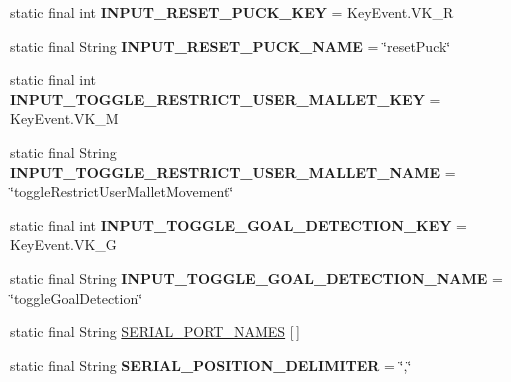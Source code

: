 \begin{DoxyCompactItemize}
\item 
\hypertarget{classairhockeyjava_1_1game_1_1_constants_ac1cc01461daf8fe8e9f797491b94dc05}{}static final int {\bfseries I\+N\+P\+U\+T\+\_\+\+R\+E\+S\+E\+T\+\_\+\+P\+U\+C\+K\+\_\+\+K\+E\+Y} = Key\+Event.\+V\+K\+\_\+\+R\label{classairhockeyjava_1_1game_1_1_constants_ac1cc01461daf8fe8e9f797491b94dc05}

\item 
\hypertarget{classairhockeyjava_1_1game_1_1_constants_ae5306e042a09328139a4c2d73fafe5e0}{}static final String {\bfseries I\+N\+P\+U\+T\+\_\+\+R\+E\+S\+E\+T\+\_\+\+P\+U\+C\+K\+\_\+\+N\+A\+M\+E} = \char`\"{}reset\+Puck\char`\"{}\label{classairhockeyjava_1_1game_1_1_constants_ae5306e042a09328139a4c2d73fafe5e0}

\item 
\hypertarget{classairhockeyjava_1_1game_1_1_constants_a06ecde8b39733daa50f93d2723623ba3}{}static final int {\bfseries I\+N\+P\+U\+T\+\_\+\+T\+O\+G\+G\+L\+E\+\_\+\+R\+E\+S\+T\+R\+I\+C\+T\+\_\+\+U\+S\+E\+R\+\_\+\+M\+A\+L\+L\+E\+T\+\_\+\+K\+E\+Y} = Key\+Event.\+V\+K\+\_\+\+M\label{classairhockeyjava_1_1game_1_1_constants_a06ecde8b39733daa50f93d2723623ba3}

\item 
\hypertarget{classairhockeyjava_1_1game_1_1_constants_aab68cda09d0a71d0eb4ddd026b05b819}{}static final String {\bfseries I\+N\+P\+U\+T\+\_\+\+T\+O\+G\+G\+L\+E\+\_\+\+R\+E\+S\+T\+R\+I\+C\+T\+\_\+\+U\+S\+E\+R\+\_\+\+M\+A\+L\+L\+E\+T\+\_\+\+N\+A\+M\+E} = \char`\"{}toggle\+Restrict\+User\+Mallet\+Movement\char`\"{}\label{classairhockeyjava_1_1game_1_1_constants_aab68cda09d0a71d0eb4ddd026b05b819}

\item 
\hypertarget{classairhockeyjava_1_1game_1_1_constants_a1f63f77f1b3bb47deee33b71cabecad9}{}static final int {\bfseries I\+N\+P\+U\+T\+\_\+\+T\+O\+G\+G\+L\+E\+\_\+\+G\+O\+A\+L\+\_\+\+D\+E\+T\+E\+C\+T\+I\+O\+N\+\_\+\+K\+E\+Y} = Key\+Event.\+V\+K\+\_\+\+G\label{classairhockeyjava_1_1game_1_1_constants_a1f63f77f1b3bb47deee33b71cabecad9}

\item 
\hypertarget{classairhockeyjava_1_1game_1_1_constants_a49c2c5d230968a75cac83116ee111f34}{}static final String {\bfseries I\+N\+P\+U\+T\+\_\+\+T\+O\+G\+G\+L\+E\+\_\+\+G\+O\+A\+L\+\_\+\+D\+E\+T\+E\+C\+T\+I\+O\+N\+\_\+\+N\+A\+M\+E} = \char`\"{}toggle\+Goal\+Detection\char`\"{}\label{classairhockeyjava_1_1game_1_1_constants_a49c2c5d230968a75cac83116ee111f34}

\item 
static final String \hyperlink{classairhockeyjava_1_1game_1_1_constants_a538ce6fb82e0fba366842a33962fc283}{S\+E\+R\+I\+A\+L\+\_\+\+P\+O\+R\+T\+\_\+\+N\+A\+M\+E\+S} \mbox{[}$\,$\mbox{]}
\item 
\hypertarget{classairhockeyjava_1_1game_1_1_constants_a1c53c2629a52ddb603eb5a3e0d3ea99a}{}static final String {\bfseries S\+E\+R\+I\+A\+L\+\_\+\+P\+O\+S\+I\+T\+I\+O\+N\+\_\+\+D\+E\+L\+I\+M\+I\+T\+E\+R} = \char`\"{},\char`\"{}\label{classairhockeyjava_1_1game_1_1_constants_a1c53c2629a52ddb603eb5a3e0d3ea99a}


\end{DoxyCompactItemize}
